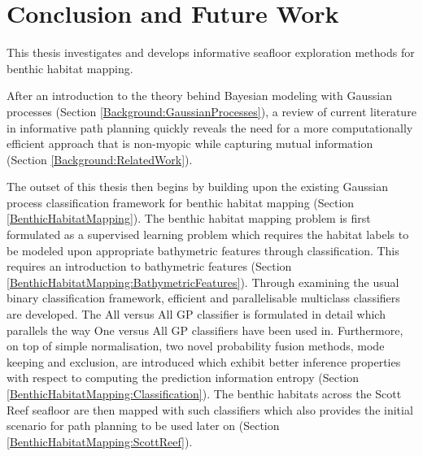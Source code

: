 \chapter{Conclusion and Future Work}
\label{Conclusion}

	This thesis investigates and develops informative seafloor exploration methods for benthic habitat mapping.
	
	After an introduction to the theory behind Bayesian modeling with Gaussian processes (Section \ref{Background:GaussianProcesses}), a review of current literature in informative path planning quickly reveals the need for a more computationally efficient approach that is non-myopic while capturing mutual information (Section \ref{Background:RelatedWork}).
	
	The outset of this thesis then begins by building upon the existing Gaussian process classification framework for benthic habitat mapping (Section \ref{BenthicHabitatMapping}). The benthic habitat mapping problem is first formulated as a supervised learning problem which requires the habitat labels to be modeled upon appropriate bathymetric features through classification. This requires an introduction to bathymetric features (Section \ref{BenthicHabitatMapping:BathymetricFeatures}). Through examining the usual binary classification framework, efficient and parallelisable multiclass classifiers are developed. The All versus All GP classifier is formulated in detail which parallels the way One versus All GP classifiers have been used in. Furthermore, on top of simple normalisation, two novel probability fusion methods, mode keeping and exclusion, are introduced which exhibit better inference properties with respect to computing the prediction information entropy (Section \ref{BenthicHabitatMapping:Classification}). The benthic habitats across the Scott Reef seafloor are then mapped with such classifiers which also provides the initial scenario for path planning to be used later on (Section \ref{BenthicHabitatMapping:ScottReef}).
	

